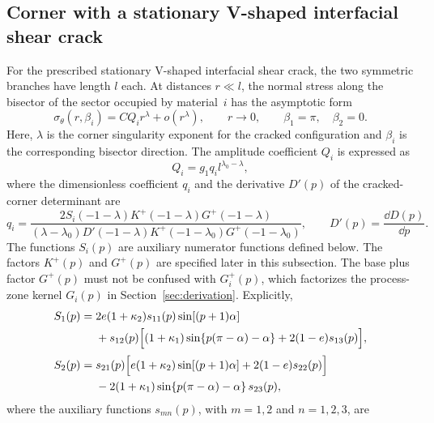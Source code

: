 \subsection{Corner with a stationary V-shaped interfacial shear crack}

For the prescribed stationary V-shaped interfacial shear crack, the two
symmetric branches have length $l$ each. At distances $r\ll l$, the normal stress along the bisector
of the sector occupied by material~$i$ has the asymptotic
form~\cite{NazarenkoKipnis2022Stress}
\begin{equation}
\label{eq:app-cracked-field}
  \sigma_\theta(r,\beta_i)
  =CQ_i r^\lambda+o\!\left(r^\lambda\right),
  \qquad r\to0,
  \qquad
  \beta_1=\pi,\quad \beta_2=0.
\end{equation}
Here, $\lambda$ is the corner singularity exponent for the cracked
configuration and $\beta_i$ is the corresponding bisector direction.
The amplitude coefficient $Q_i$ is expressed as
\begin{equation*}
  Q_i=g_1q_i l^{\lambda_0-\lambda},
\end{equation*}
where the dimensionless coefficient $q_i$ and the derivative $D'(p)$
of the cracked-corner determinant are
\begin{equation*}
  q_i=
  \frac{2S_i(-1-\lambda)K^+(-1-\lambda)G^+(-1-\lambda)}
  {(\lambda-\lambda_0)D'(-1-\lambda)
   K^+(-1-\lambda_0)G^+(-1-\lambda_0)},
  \qquad
  D'(p)=\frac{\dd D(p)}{\dd p}.
\end{equation*}
The functions $S_i(p)$ are auxiliary numerator functions defined below.
The factors $K^+(p)$ and $G^+(p)$ are specified later in this subsection.
The base plus factor $G^+(p)$ must not be confused with $G_i^+(p)$, which
factorizes the process-zone kernel $G_i(p)$ in
Section~\ref{sec:derivation}. Explicitly,
\begin{equation*}
\begin{aligned}
  S_1(p)={}&2e(1+\kappa_2)s_{11}(p)\sin[(p+1)\alpha]\\
  &+s_{12}(p)
  \Bigl[(1+\kappa_1)\sin\{p(\pi-\alpha)-\alpha\}
        +2(1-e)s_{13}(p)\Bigr],\\[2pt]
  S_2(p)={}&s_{21}(p)
  \Bigl[e(1+\kappa_2)\sin[(p+1)\alpha]
        +2(1-e)s_{22}(p)\Bigr]\\
  &-2(1+\kappa_1)\sin\{p(\pi-\alpha)-\alpha\}\,s_{23}(p),
\end{aligned}
\end{equation*}
where the auxiliary functions $s_{mn}(p)$, with $m=1,2$ and
$n=1,2,3$, are
